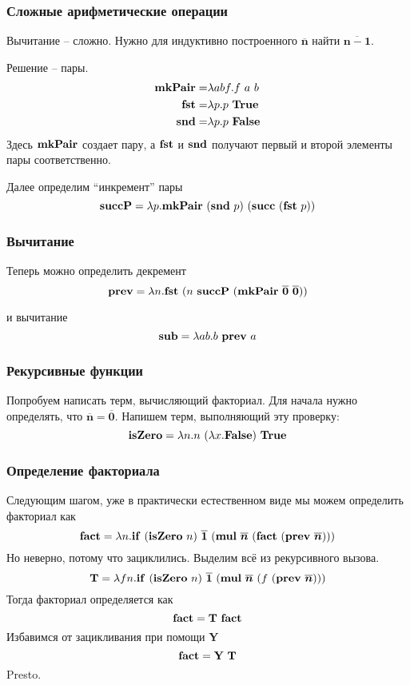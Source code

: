 \documentclass{beamer}
\newcommand{\mmterm}[1]{\text{\textbf{#1}}}
\newcommand{\mmif}{\mmterm{if}}
\newcommand{\mmt}{\mmterm{True}}
\newcommand{\mmf}{\mmterm{False}}
\newcommand{\mmchurchn}[1]{\boldsymbol{\overline{#1}}}
\begin{document}
\begin{frame}\frametitle{Сложные арифметические операции}
    
Вычитание -- сложно.
Нужно для индуктивно построенного $\mmchurchn{n}$ найти $\mmchurchn{n-1}$.

Решение -- пары.
\begin{align*}
	\mmterm{mkPair} = &\lambda abf.f\ a\ b\\
	\mmterm{fst} = &\lambda p.p\ \mmterm{True}\\
	\mmterm{snd} = &\lambda p.p\ \mmterm{False}
\end{align*}
Здесь $\mmterm{mkPair}$ создает пару, а $\mmterm{fst}$ и $\mmterm{snd}$ получают первый и второй элементы пары соответственно.

Далее определим ``инкремент'' пары
\[\mmterm{succP} = \lambda p. \mmterm{mkPair}\ (\mmterm{snd}\ p)\ (\mmterm{succ}\ (\mmterm{fst}\ p))\]

\end{frame}

\begin{frame}\frametitle{Вычитание}
    
Теперь можно определить декремент
\[\mmterm{prev} = \lambda n.\mmterm{fst}\ (n\ \mmterm{succP}\ (\mmterm{mkPair}\ \mmchurchn{0}\ \mmchurchn{0}))\]

и вычитание
\[\mmterm{sub} = \lambda ab.b\ \mmterm{prev}\ a\]

\end{frame}

\begin{frame}\frametitle{Рекурсивные функции}
    
Попробуем написать терм, вычисляющий факториал.
Для начала нужно определять, что $\mmchurchn{n} = \mmchurchn{0}$.
Напишем терм, выполняющий эту проверку:
\[\mmterm{isZero} = \lambda n.n\ (\lambda x. \mmf)\ \mmt\]

\end{frame}

\begin{frame}\frametitle{Определение факториала}
    
Следующим шагом, уже в практически естественном виде мы можем определить факториал как
\[\mmterm{fact} = \lambda n. \mmif\ (\mmterm{isZero}\ n)\ \mmchurchn{1}\ (\mmterm{mul}\ \mmchurchn{n}\ (\mmterm{fact}\ (\mmterm{prev}\ \mmchurchn{n})))\]
Но неверно, потому что зациклились.
Выделим всё из рекурсивного вызова.
\[\mmterm{T} = \lambda fn. \mmif\ (\mmterm{isZero}\ n)\ \mmchurchn{1}\ (\mmterm{mul}\ \mmchurchn{n}\ (f\ (\mmterm{prev}\ \mmchurchn{n})))\]
Тогда факториал определяется как
\[\mmterm{fact} = \mmterm{T}\ \mmterm{fact}\]
Избавимся от зацикливания при помощи \textbf{Y}
\[\mmterm{fact} = \mmterm{Y}\ \mmterm{T}\]
Presto.
\end{frame}
\end{document}

